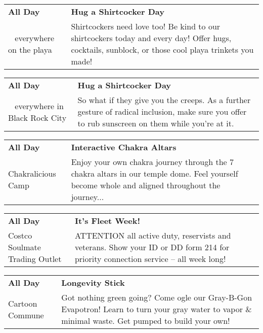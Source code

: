 \begin{tabular}{ p{1in} p{2.2in} }
    \textbf{All Day} & \textbf{Hug a Shirtcocker Day} \\
    ~ \newline everywhere on the playa & Shirtcockers need love too! Be kind to our shirtcockers today and every day! Offer hugs, cocktails, sunblock, or those cool playa trinkets you made! \\
    \hline 
\end{tabular}
    
\begin{tabular}{ p{1in} p{2.2in} }
    \textbf{All Day} & \textbf{Hug a Shirtcocker Day} \\
    ~ \newline everywhere in Black Rock City & So what if they give you the creeps. As a further gesture of radical inclusion, make sure you offer to rub sunscreen on them while you're at it. \\
    \hline 
\end{tabular}
    
\begin{tabular}{ p{1in} p{2.2in} }
    \textbf{All Day} & \textbf{Interactive Chakra Altars} \\
    Chakralicious Camp \newline  & Enjoy your own chakra journey through the 7 chakra altars in our temple dome. Feel yourself become whole and aligned throughout the journey... \\
    \hline 
\end{tabular}
    
\begin{tabular}{ p{1in} p{2.2in} }
    \textbf{All Day} & \textbf{It's Fleet Week!} \\
    Costco Soulmate Trading Outlet \newline  & ATTENTION all active duty, reservists and veterans. Show your ID or DD form 214 for priority connection service -- all week long! \\
    \hline 
\end{tabular}
    
\begin{tabular}{ p{1in} p{2.2in} }
    \textbf{All Day} & \textbf{Longevity Stick} \\
    Cartoon Commune \newline  & Got nothing green going? Come ogle our Gray-B-Gon Evapotron! Learn to turn your gray water to vapor \& minimal waste. Get pumped to build your own! \\
    \hline 
\end{tabular}
    
